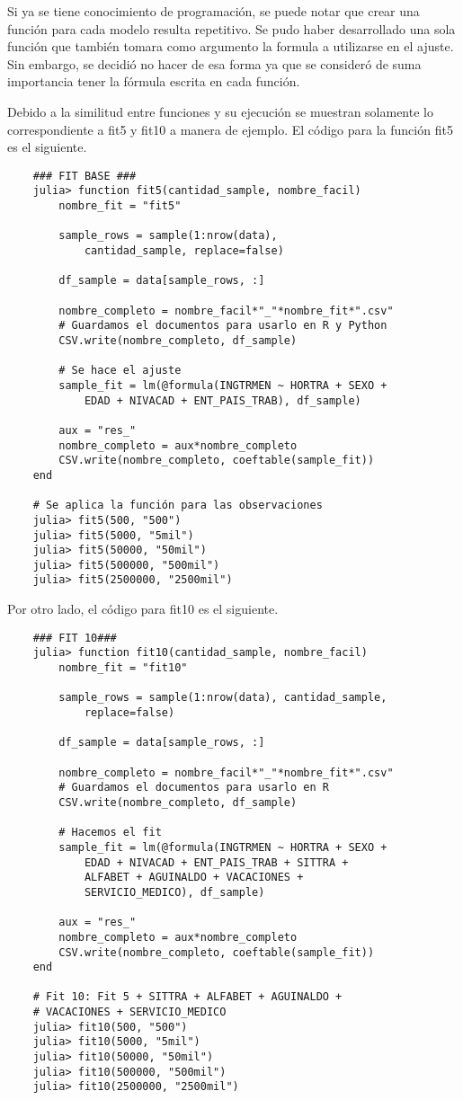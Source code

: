 Si ya se tiene conocimiento de programación, se puede notar que crear una función para cada modelo resulta repetitivo. Se pudo haber desarrollado una sola función que también tomara como argumento la formula a utilizarse en el ajuste. Sin embargo, se decidió no hacer de esa forma ya que se consideró de suma importancia tener la fórmula escrita en cada función. 

Debido a la similitud entre funciones y su ejecución se muestran solamente lo correspondiente a \textsf{fit5} y \textsf{fit10} a manera de ejemplo. El código para la función \textsf{fit5} es el siguiente.

\begin{verbatim}
	### FIT BASE ###
	julia> function fit5(cantidad_sample, nombre_facil)
    	nombre_fit = "fit5"
    
    	sample_rows = sample(1:nrow(data), 
    		cantidad_sample, replace=false)

    	df_sample = data[sample_rows, :]
    
    	nombre_completo = nombre_facil*"_"*nombre_fit*".csv"
    	# Guardamos el documentos para usarlo en R y Python
    	CSV.write(nombre_completo, df_sample)

    	# Se hace el ajuste
    	sample_fit = lm(@formula(INGTRMEN ~ HORTRA + SEXO + 
    		EDAD + NIVACAD + ENT_PAIS_TRAB), df_sample)

    	aux = "res_"
    	nombre_completo = aux*nombre_completo
    	CSV.write(nombre_completo, coeftable(sample_fit))
	end 

	# Se aplica la función para las observaciones
	julia> fit5(500, "500")
	julia> fit5(5000, "5mil")
	julia> fit5(50000, "50mil")
	julia> fit5(500000, "500mil")
	julia> fit5(2500000, "2500mil")

\end{verbatim}

Por otro lado, el código para \textsf{fit10} es el siguiente. 

\begin{verbatim}
	### FIT 10###
	julia> function fit10(cantidad_sample, nombre_facil)
    	nombre_fit = "fit10"
    
    	sample_rows = sample(1:nrow(data), cantidad_sample, 
    		replace=false)

    	df_sample = data[sample_rows, :]
    
    	nombre_completo = nombre_facil*"_"*nombre_fit*".csv"
    	# Guardamos el documentos para usarlo en R
    	CSV.write(nombre_completo, df_sample)

    	# Hacemos el fit
    	sample_fit = lm(@formula(INGTRMEN ~ HORTRA + SEXO + 
    		EDAD + NIVACAD + ENT_PAIS_TRAB + SITTRA + 
    		ALFABET + AGUINALDO + VACACIONES +
    		SERVICIO_MEDICO), df_sample)

    	aux = "res_"
    	nombre_completo = aux*nombre_completo
    	CSV.write(nombre_completo, coeftable(sample_fit))
	end 

	# Fit 10: Fit 5 + SITTRA + ALFABET + AGUINALDO + 
	# VACACIONES + SERVICIO_MEDICO
	julia> fit10(500, "500")
	julia> fit10(5000, "5mil")
	julia> fit10(50000, "50mil")
	julia> fit10(500000, "500mil")
	julia> fit10(2500000, "2500mil")

\end{verbatim}

